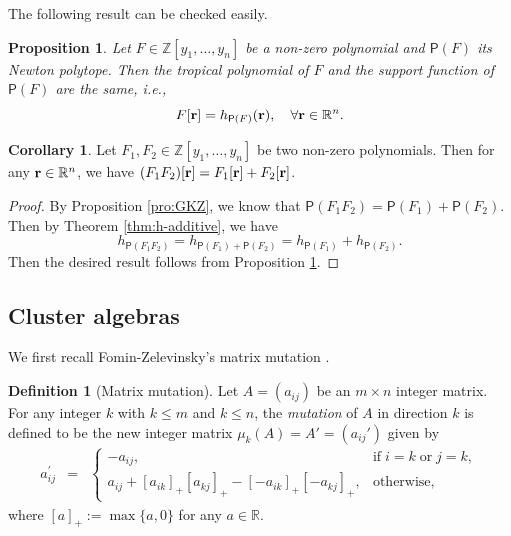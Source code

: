 \documentclass[10pt]{amsart}
\newtheorem{proposition}[theorem]{Proposition}
\theoremstyle{definition}
\newtheorem{definition}[theorem]{Definition}
\newtheorem{corollary}[theorem]{Corollary}
\theoremstyle{remark}
\newtheorem{remark}[theorem]{Remark}
\numberwithin{equation}{section}
\begin{document}
The following result can be checked easily.
\begin{proposition}\label{pro:trop-support}
    Let $F\in\mathbb Z[y_1,\ldots,y_n]$ be a non-zero polynomial and $\mathsf P(F)$ its Newton polytope. Then the tropical polynomial of $F$ and 
    the support function 
    of $\mathsf P(F)$ are the same, i.e.,
 \[ F[{\bf r}]=h_{\mathsf P(F)}({\bf r}),\quad \forall {\bf r}\in\mathbb R^n.\]   
\end{proposition}

\begin{corollary}\label{cor-F-prod}
Let $F_1,F_2\in\mathbb Z[y_1,\ldots,y_n]$ be two non-zero polynomials. Then for any ${\bf r}\in\mathbb R^n$, we have $(F_1F_2)[{\bf r}]=F_1[{\bf r}]+F_2[{\bf r}]$.
\end{corollary}
\begin{proof}
By Proposition \ref{pro:GKZ}, we know that  $\mathsf P(F_1F_2)=\mathsf P(F_1)+\mathsf P(F_2)$. Then by Theorem \ref{thm:h-additive}, we have
\[h_{\mathsf P(F_1F_2)}=h_{\mathsf P(F_1)+\mathsf P(F_2)}=h_{\mathsf P(F_1)}+h_{\mathsf P(F_2)}.\] Then the desired result follows from Proposition \ref{pro:trop-support}.
\end{proof}


\subsection{Cluster algebras}
We first recall Fomin-Zelevinsky's  matrix mutation \cite{fz_2002}. 

\begin{definition}[Matrix mutation]Let $A=(a_{ij})$ be an $m\times n$ integer matrix. For any integer $k$ with $k\leq m$ and $k\leq n$, the  {\em mutation} of $A$
   in direction $k$ is
defined to be the new integer matrix $\mu_k(A)=A'=(a_{ij}')$ given by
\begin{eqnarray}\label{eqn:b-mutation}
a_{ij}^\prime&=&\begin{cases}-a_{ij}, & \text{if}\;i=k\;\text{or}\;j=k,\\
 a_{ij}+[a_{ik}]_+[a_{kj}]_+-[-a_{ik}]_+[-a_{kj}]_+,&\text{otherwise},\end{cases}\nonumber
\end{eqnarray}
where $[a]_+:=\max\{a,0\}$ for any $a\in\mathbb R$.
\end{definition}

\end{document}
